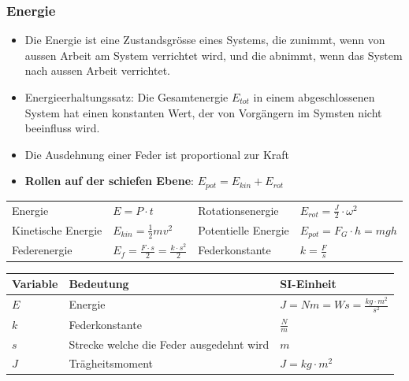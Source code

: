 \subsubsection{Energie}
\begin{itemize}
	\item Die Energie ist eine Zustandsgrösse eines Systems, die zunimmt, wenn von aussen Arbeit am System verrichtet wird, und die abnimmt, wenn das System nach aussen Arbeit verrichtet.
	\item Energieerhaltungssatz: Die Gesamtenergie $E_{tot}$ in einem abgeschlossenen System hat einen konstanten Wert, der von Vorgängern im Symsten nicht beeinfluss wird.
	\item Die Ausdehnung einer Feder ist proportional zur Kraft
	\item \textbf{Rollen auf der schiefen Ebene}: $E_{pot} = E_{kin} + E_{rot}$
\end{itemize}
\begin{tabbing}
	\begin{tabu} to \linewidth {l X l X}
		\toprule
		Energie & $E = P \cdot t$ & Rotationsenergie & $E_{rot} = \frac{J}{2} \cdot \omega^2 $\\
		Kinetische Energie & $E_{kin} = \frac{1}{2}mv^2$ &
		Potentielle Energie & $E_{pot} = F_G \cdot h =  mgh$ \\
		Federenergie & $E_f = \frac{F \cdot s}{2} = \frac{k \cdot s^2}{2}$ &
		Federkonstante & $k = \frac{F}{s}$ \\
	\end{tabu}
\end{tabbing}

\begin{tabbing}
	\begin{tabu} to \linewidth {l X l}
		Variable & Bedeutung & SI-Einheit \\
		\midrule
		$E$ & Energie & $J = Nm = Ws = \frac{kg \cdot m^2}{s^2}$ \\
		$k$ & Federkonstante & $\frac{N}{m}$  \\
		$s$ & Strecke welche die Feder ausgedehnt wird & $m$ \\
		$J$ & Trägheitsmoment & $J = kg \cdot m^2$ \\
		\bottomrule
	\end{tabu}
\end{tabbing}

